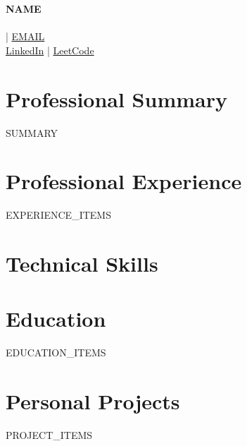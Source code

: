 \documentclass[11pt,a4paper]{article}
\begin{document}
\begin{center}
    \textbf{\large {{NAME}}} \\
    \vspace{6pt}
     \\
     | \href{mailto:{{EMAIL}}}{{{EMAIL}}} \\
    \normalfont \href{{{LINKEDIN}}}{LinkedIn} | \href{{{LEETCODE}}}{LeetCode}
\end{center}

\section{Professional Summary}
{{SUMMARY}}

\section{Professional Experience}
\begin{itemize}[leftmargin=0.15in, label={}]
{{EXPERIENCE_ITEMS}}
\end{itemize}


\section{Technical Skills}
\begin{itemize}[leftmargin=0.15in, label={}]
\end{itemize}



\section{Education}
\begin{itemize}[leftmargin=0.15in, label={}]
{{EDUCATION_ITEMS}}
\end{itemize}

\section{Personal Projects}
\begin{itemize}[leftmargin=0.15in, label={}]
{{PROJECT_ITEMS}}
\end{itemize}
\end{document}

